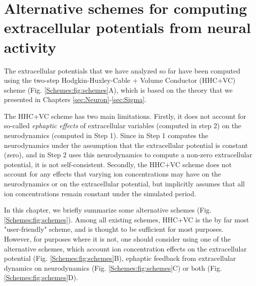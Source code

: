 \chapter{Alternative schemes for computing extracellular potentials from neural activity}
\label{sec:Schemes}

The extracellular potentials that we have analyzed so far have been computed using the two-step Hodgkin-Huxley-Cable + Volume Conductor (HHC+VC) scheme (Fig. \ref{Schemes:fig:schemes}A), which is based on the theory that we presented in Chapters \ref{sec:Neuron}-\ref{sec:Sigma}. 

The HHC+VC scheme has two main limitations. Firstly, it does not account for so-called \textit{ephaptic effects} of extracellular variables (computed in step 2) on the neurodynamics (computed in Step 1). Since in Step 1 computes the neurodynamics under the assumption that the extracellular potential is constant (zero), and in Step 2 uses this neurodynamics to compute a non-zero extracellular potential, it is not self-consistent. Secondly, the HHC+VC scheme does not account for any effects that varying ion concentrations may have on the neurodynamics or on the extracellular potential, but implicitly assumes that all ion concentrations remain constant under the simulated period. 

In this chapter, we briefly summarize some alternative schemes (Fig. \ref{Schemes:fig:schemes}).
Among all existing schemes, HHC+VC is the by far most "user-friendly" scheme, and is thought to be sufficient for most purposes. However, for purposes where it is not, one should consider using one of the alternative schemes, which account ion concentration effects on the extracellular potential (Fig. \ref{Schemes:fig:schemes}B), ephaptic feedback from extracellular dynamics on neurodynamics (Fig. \ref{Schemes:fig:schemes}C) or both (Fig. \ref{Schemes:fig:schemes}D).



